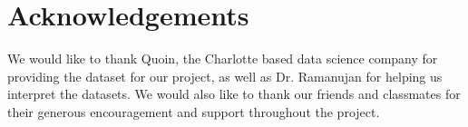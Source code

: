
\section{Acknowledgements} 
\label{sec:ack} 

We would like to thank Quoin, the Charlotte based data science company for providing the dataset for our project, as well as Dr.  Ramanujan for helping us interpret the datasets. We would also like to thank our friends and classmates for their generous encouragement and support throughout the project.
